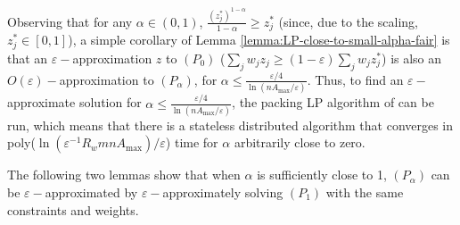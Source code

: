 \documentclass[11pt]{article}
\newcommand{\wratio}{R_w}
\begin{document}
\fi
Observing that for any $\alpha\in(0, 1)$, $\frac{(z_j^*)^{1-\alpha}}{1-\alpha}\geq z_j^*$ (since, due to the scaling, $z_j^*\in[0, 1]$), a simple corollary of Lemma \ref{lemma:LP-close-to-small-alpha-fair} is that an $\varepsilon-$approximation $z$ to $(P_0)$ ($\sum_j w_j z_j \geq (1-\varepsilon)\sum_j w_j z_j^*$) is also an $O(\varepsilon)-$approximation to $(P_{\alpha})$, for $\alpha \leq \frac{\varepsilon/4}{\ln(nA_{\max}/\varepsilon)}$. Thus, to find an $\varepsilon-$approximate solution for $\alpha \leq \frac{\varepsilon/4}{\ln(nA_{\max}/\varepsilon)}$, the packing LP algorithm of \cite{AwerbuchKhandekar2009} can be run, which means that there is a stateless distributed algorithm that converges in poly($\ln(\varepsilon^{-1}\wratio mnA_{\max})/\varepsilon$) time for $\alpha$ arbitrarily close to zero.

The following two lemmas show that when $\alpha$ is sufficiently close to 1, $(P_{\alpha})$ can be $\varepsilon-$approximated by $\varepsilon-$approximately solving $(P_1)$ with the same constraints and weights.
\end{document}
